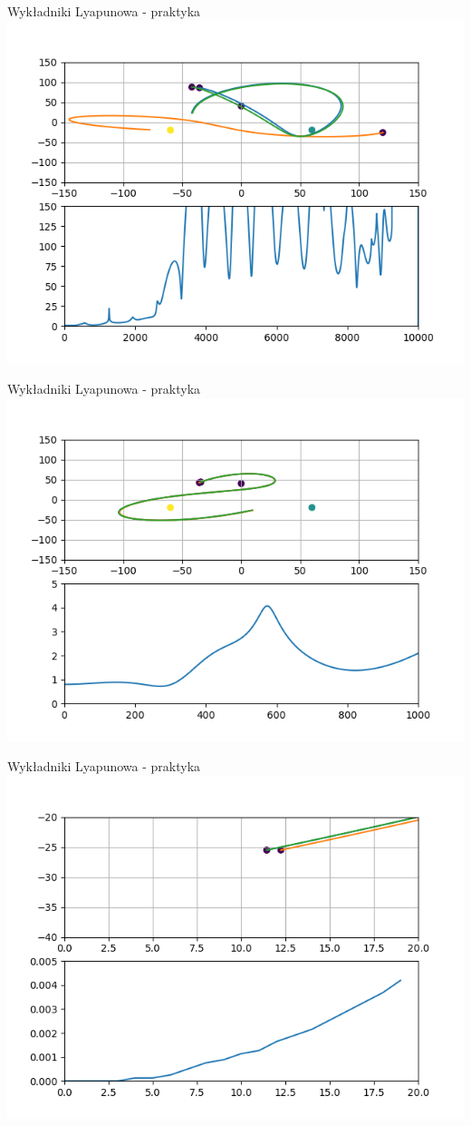 \documentclass{beamer}
\begin{document}
\begin{frame}{Wykładniki Lyapunowa - praktyka}
\includegraphics[width=\textwidth]{lyapunov}
\end{frame}

\begin{frame}{Wykładniki Lyapunowa - praktyka}
\includegraphics[width=\textwidth]{lyapunov_short}
\end{frame}

\begin{frame}{Wykładniki Lyapunowa - praktyka}
\includegraphics[width=\textwidth]{lyapunov_very_short}
\end{frame}

\begin{frame}
\nocite{stewart1994czy}
{}

\end{frame}
\end{document}
